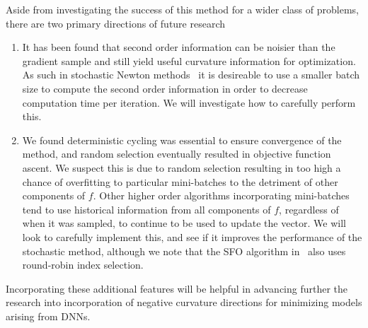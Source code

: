 \documentclass[psamsfonts,onesided,10pt]{amsart}
\theoremstyle{definition}
\theoremstyle{remark}
\numberwithin{equation}{section}
\begin{document}
Aside from investigating the success of this method for a wider class of problems, there are two primary directions of future research
\begin{enumerate}
\item It has been found that second order information can be noisier than the gradient sample and still yield useful curvature information
for optimization. As such in stochastic Newton methods~\cite{byrd2011use} it is desireable to use a smaller batch size to compute the second order
information in order to decrease computation time per iteration. We will investigate how to carefully perform this.
\item We found deterministic cycling was essential to ensure convergence of the method, and random selection eventually resulted in objective
function ascent. We suspect this is due to random selection resulting in too high a chance of overfitting to particular mini-batches to the detriment
of other components of $f$. Other higher order algorithms incorporating mini-batches~\cite{sohl2014fast} tend to use historical information
from all components of $f$, regardless of when it was sampled, to continue to be used to update the vector. We will look to carefully implement
this, and see if it improves the performance of the stochastic method, although we note that the SFO algorithm in~\cite{sohl2014fast} also uses
round-robin index selection. 
\end{enumerate}

Incorporating these additional features will be helpful in advancing further the research into incorporation of negative curvature directions
for minimizing models arising from DNNs.




\end{document}
